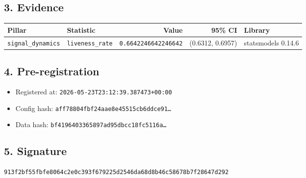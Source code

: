 \documentclass{article}
\begin{document}
\subsection*{3. Evidence}
\begin{tabular}{llrrl}\toprule
\textbf{Pillar} & \textbf{Statistic} & \textbf{Value} & \textbf{95\% CI} & \textbf{Library} \\\midrule
\texttt{signal\_dynamics} & \texttt{liveness\_rate} & \texttt{0.6642246642246642} & (0.6312, 0.6957) & statsmodels 0.14.6 \\
\bottomrule\end{tabular}
\subsection*{4. Pre-registration}
\begin{itemize}
\item Registered at: \texttt{2026-05-23T23:12:39.387473+00:00}
\item Config hash: \texttt{aff78804fbf24aae8e45515cb6ddce91\dots}
\item Data hash: \texttt{bf4196403365897ad95dbcc18fc5116a\dots}
\end{itemize}
\subsection*{5. Signature}
\texttt{913f2bf55fbfe8064c2e0c393f679225d2546da68d8b46c58678b7f28647d292}\\
\end{document}
